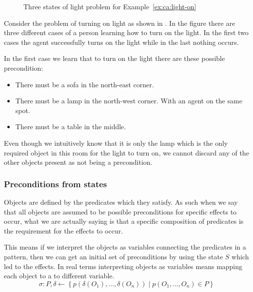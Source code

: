 \documentclass[\master/Master.tex]{subfiles}
\begin{document}
\begin{figure}
	\caption{\label{fig:ca:house-example}Three states of light problem for Example~\ref{ex:ca:light-on}}
\end{figure}

\begin{example}\label{ex:ca:light-on}
Consider the problem of turning on light as shown in .
In the figure there are three different cases of a person learning how to turn on the
light. In the first two cases the agent successfully turns on the light while in the last nothing occurs.

In the first case we learn that to turn on the light there are these possible precondition:
\begin{itemize}
	\item There must be a sofa in the north-east corner.
	\item There must be a lamp in the north-west corner. With an agent on the same spot.
	\item There must be a table in the middle.
\end{itemize}
Even though we intuitively know that it is only the lamp which is the only required object in this room for the light to turn on, we cannot discard any of the other objects present as not being a precondition.
\end{example}

\subsubsection{Preconditions from states}
Objects are defined by the predicates which they satisfy. As such when we say that all objects are assumed to be possible preconditions for specific effects to occur, what we are actually saying is that a specific composition of predicates is the requirement for the effects to occur.


This means if we interpret the objects as variables connecting the predicates in a pattern, then we can get an initial set of preconditions by using the state $S$ which led to the effects. In real terms interpreting objects as variables means mapping each object 
to a to different variable.
\begin{equation*}
	\sigma : P, \delta \leftarrow \left\{p\left(\delta(O_1),\ldots,\delta(O_n) \right) \mid p(O_1,\ldots,O_n) \in P  \right\}
\end{equation*}
\end{document}

